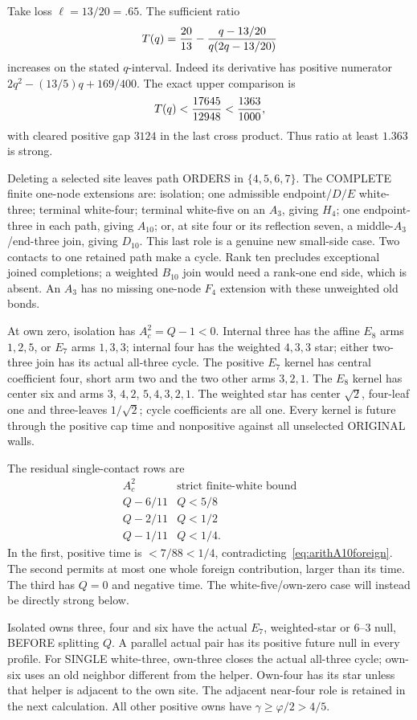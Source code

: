 Take loss \(\ell=13/20=.65\).
The sufficient ratio
\[
 T(q)={20\over13}
       -{q-13/20\over q(2q-13/20)}
\]
increases on the stated \(q\)-interval.
Indeed its derivative has positive numerator
\(2q^2-(13/5)q+169/400\).
The exact upper comparison is
\[
 T(q)<{17645\over12948}<{1363\over1000},
\]
with cleared positive gap \(3124\) in the
last cross product.
Thus ratio at least \(1.363\) is strong.

Deleting a selected site leaves path ORDERS
in \(\{4,5,6,7\}\).
The COMPLETE finite one-node extensions are:
isolation; one admissible endpoint/\(D/E\)
white-three; terminal white-four; terminal
white-five on an \(A_3\), giving \(H_4\);
one endpoint-three in each path, giving
\(A_{10}\); or, at site four or its
reflection seven, a middle-\(A_3\)/end-three
join, giving \(D_{10}\).
This last role is a genuine new small-side
case.  Two contacts to one retained path
make a cycle.  Rank ten precludes exceptional
joined completions; a weighted \(B_{10}\)
join would need a rank-one end side, which
is absent.  An \(A_3\) has no missing
one-node \(F_4\) extension with these
unweighted old bonds.

At own zero, isolation has \(A_c^2=Q-1<0\).
Internal three has the affine \(E_8\) arms
\(1,2,5\), or \(E_7\) arms \(1,3,3\);
internal four has the weighted \(4,3,3\)
star; either two-three join has its actual
all-three cycle.
The positive \(E_7\) kernel has central
coefficient four, short arm two and the
two other arms \(3,2,1\).
The \(E_8\) kernel has center six and
arms \(3\), \(4,2\), \(5,4,3,2,1\).
The weighted star has center \(\sqrt2\),
four-leaf one and three-leaves \(1/\sqrt2\);
cycle coefficients are all one.
Every kernel is future through the positive
cap time and nonpositive against all
unselected ORIGINAL walls.

The residual single-contact rows are
\[
 \begin{array}{c|c}
 A_c^2&\text{strict finite-white bound}\\ \hline
 Q-6/11&Q<5/8\\
 Q-2/11&Q<1/2\\
 Q-1/11&Q<1/4 .
 \end{array}
\]
In the first, positive time is \(<7/88<1/4\),
contradicting~\eqref{eq:arithA10foreign}.
The second permits at most one whole
foreign contribution, larger than its time.
The third has \(Q=0\) and negative time.
The white-five/own-zero case will instead
be directly strong below.

Isolated owns three, four and six have
the actual \(E_7\), weighted-star or
\(6\)--\(3\) null, BEFORE splitting \(Q\).
A parallel actual pair has its positive
future null in every profile.
For SINGLE white-three, own-three closes
the actual all-three cycle; own-six uses
an old neighbor different from the helper.
Own-four has its star unless that helper
is adjacent to the own site.
The adjacent near-four role is retained
in the next calculation.
All other positive owns have
\(\gamma\ge\varphi/2>4/5\).

